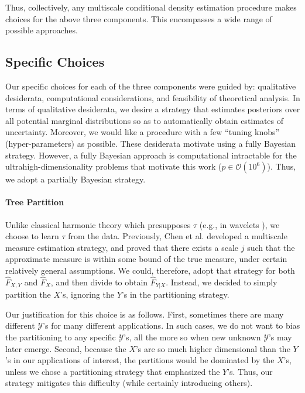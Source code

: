\documentclass{article} %
\providecommand{\mh}[1]{\hat{#1}}
\providecommand{\mc}[1]{\mathcal{#1}}
\begin{document}
Thus, collectively, any multiscale conditional density estimation procedure makes choices for the above three components.  This encompasses a wide range of possible approaches. 



\subsection{Specific Choices} \label{sub:spec}

Our specific choices for each of the three components were guided by: qualitative desiderata, computational considerations, and feasibility of theoretical analysis.  In terms of qualitative desiderata, we desire a strategy that estimates posteriors over all potential marginal distributions so as to automatically obtain estimates of uncertainty.  Moreover, we would like a procedure with a few ``tuning knobs'' (hyper-parameters) as possible.  These desiderata motivate using a fully Bayesian strategy.  
However, a fully Bayesian approach is computational intractable for the ultrahigh-dimensionality problems that motivate this work ($ p \in \mc{O}(10^6)$).  Thus, we adopt a partially Bayesian strategy.  

	\paragraph{Tree Partition} Unlike classical harmonic theory which presupposes $\tau$ (e.g., in wavelets \cite{Daubechies1992}), we choose to learn $\tau$ from the data. Previously, Chen et al. \cite{ChenMaggioni12} developed a multiscale measure estimation strategy, and proved that there exists a scale $j$ such that the approximate measure is within some bound of the true measure, under certain relatively general assumptions.  We could, therefore, adopt that strategy for both $\mh{F}_{X,Y}$ and $\mh{F}_{X}$, and then divide to obtain $\mh{F}_{Y|X}$.  Instead, we decided to simply partition the $X$'s, ignoring the $Y$'s in the partitioning strategy.  
	
	Our justification for this choice is as follows. First, sometimes there are many different $\mc{Y}$'s for many different applications.  In such cases, we do not want to bias the partitioning to any specific $\mc{Y}$'s, all the more so when new unknown $\mc{Y}$'s may later emerge.  Second, because the $X$'s are so much higher dimensional than the $Y$'s in our applications of interest, the partitions would be dominated by the $X$'s, unless we chose a partitioning strategy that emphasized the $Y$'s.  Thus, our strategy mitigates this difficulty (while certainly introducing others). 
\end{document}
